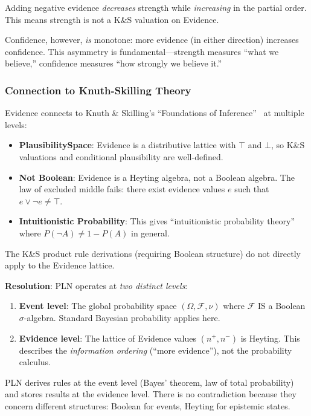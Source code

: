 \documentclass[]{article}
\begin{document}
Adding negative evidence \emph{decreases} strength while
\emph{increasing} in the partial order.  This means strength is not a
K\&S valuation on Evidence.

Confidence, however, \emph{is} monotone: more evidence (in either
direction) increases confidence.  This asymmetry is fundamental---strength
measures ``what we believe,'' confidence measures ``how strongly we
believe it.''

\subsubsection{Connection to Knuth-Skilling Theory}
Evidence connects to Knuth \& Skilling's ``Foundations of
Inference''~\cite{knuthskilling2012} at multiple levels:

\begin{itemize}
\item \textbf{PlausibilitySpace}: Evidence is a distributive lattice
  with $\top$ and $\bot$, so K\&S valuations and conditional
  plausibility are well-defined.
\item \textbf{Not Boolean}: Evidence is a Heyting algebra, not a
  Boolean algebra.  The law of excluded middle fails: there exist
  evidence values $e$ such that $e \vee \neg e \neq \top$.
\item \textbf{Intuitionistic Probability}: This gives ``intuitionistic
  probability theory'' where $P(\neg A) \neq 1 - P(A)$ in general.
\end{itemize}

The K\&S product rule derivations (requiring Boolean structure) do not
directly apply to the Evidence lattice.

\textbf{Resolution}: PLN operates at \emph{two distinct levels}:
\begin{enumerate}
\item \textbf{Event level}: The global probability space $(\Omega,
  \mathcal{F}, \nu)$ where $\mathcal{F}$ IS a Boolean $\sigma$-algebra.
  Standard Bayesian probability applies here.
\item \textbf{Evidence level}: The lattice of Evidence values $(n^+,
  n^-)$ is Heyting.  This describes the \emph{information ordering}
  (``more evidence''), not the probability calculus.
\end{enumerate}

PLN derives rules at the event level (Bayes' theorem, law of total
probability) and stores results at the evidence level.  There is no
contradiction because they concern different structures: Boolean for
events, Heyting for epistemic states.
\end{document}
